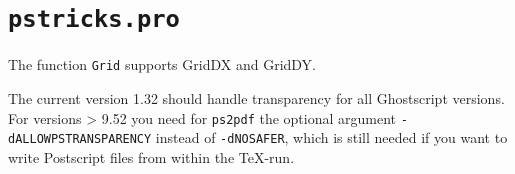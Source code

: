 \documentclass[11pt,english,BCOR=10mm,DIV=12,bibliography=totoc,parskip=false,headings=small,
    headinclude=false,footinclude=false,twoside]{scrartcl}
\begin{document}
\section{\texttt{pstricks.pro}}

The function \texttt{Grid} supports GridDX and GridDY.

The current version 1.32 should handle transparency for all Ghostscript versions.
For versions > 9.52 you need for \verb|ps2pdf| the optional argument \verb|-dALLOWPSTRANSPARENCY|
instead of \verb|-dNOSAFER|, which is still needed if you want to write Postscript files from within
the \TeX-run.


\nocite{*}
\printbibliography
\end{document}
